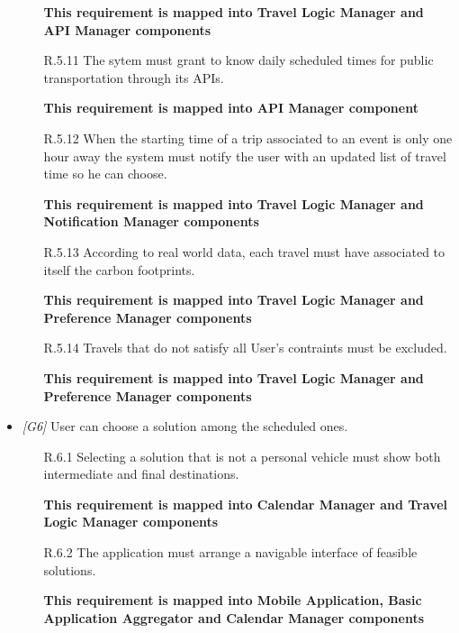 \begin{itemize}
\begin{itemize}
			\textbf{This requirement is mapped into Travel Logic Manager and API Manager components}

			\item [R.5.11] The sytem must grant to know daily scheduled times for public transportation through its APIs.
			
			\textbf{This requirement is mapped into API Manager component}

			\item [R.5.12] When the starting time of a trip associated to an event is only one hour away the system must notify the user with an updated list of travel time so he can choose.
			
			\textbf{This requirement is mapped into Travel Logic Manager and Notification Manager components}

			\item [R.5.13] According to real world data, each travel must have associated to itself the carbon footprints.
			
			\textbf{This requirement is mapped into Travel Logic Manager and Preference Manager components}

			\item [R.5.14] Travels that do not satisfy all User's contraints must be excluded.
			
			\textbf{This requirement is mapped into Travel Logic Manager and Preference Manager components}

		\end{itemize}

                  

                  

	\item \textit{[G6]} User can choose a solution among the scheduled ones. 

		\begin{itemize}

			\item [R.6.1] Selecting a solution that is not a personal vehicle must show both intermediate and final destinations.
			
			\textbf{This requirement is mapped into Calendar Manager and Travel Logic Manager components}

			\item [R.6.2] The application must arrange a navigable interface of feasible solutions.
			
			\textbf{This requirement is mapped into Mobile Application, Basic Application Aggregator and Calendar Manager components}


\end{itemize}
\end{itemize}

